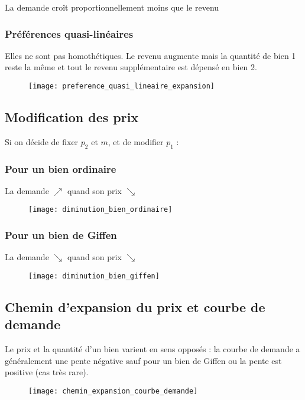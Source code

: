 La demande croît proportionnellement moins que le revenu

\subsubsection{Préférences quasi-linéaires}

Elles ne sont pas homothétiques. Le revenu augmente mais la quantité de bien 1 reste la même et tout le revenu supplémentaire est dépensé en bien 2.

\begin{figure}[H]
	\centering
	\texttt{[image: preference\_quasi\_lineaire\_expansion]}
\end{figure}

\newpage
\subsection{Modification des prix}

Si on décide de fixer $p_2$ et $m$, et de modifier $p_1$ :

\subsubsection{Pour un bien ordinaire}

La demande $\nearrow$ quand son prix $\searrow$
\begin{figure}[H]
	\centering
	\texttt{[image: diminution\_bien\_ordinaire]}
\end{figure}


\subsubsection{Pour un bien de Giffen}

La demande $\searrow$ quand son prix $\searrow$
\begin{figure}[H]
	\centering
	\texttt{[image: diminution\_bien\_giffen]}
\end{figure}

\newpage
\subsection{Chemin d'expansion du prix et courbe de demande}

Le prix et la quantité d'un bien varient en sens opposés : la courbe de demande a généralement une pente négative sauf pour un bien de Giffen ou la pente est positive (cas très rare).
\begin{figure}[H]
	\centering
	\texttt{[image: chemin\_expansion\_courbe\_demande]}
\end{figure}

